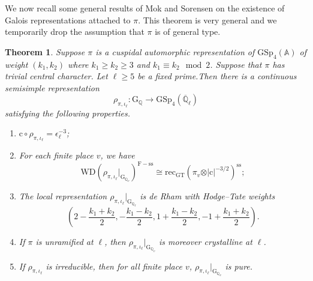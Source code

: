 \documentclass[10pt]{amsart}
\numberwithin{equation}{section}
\newtheorem{theorem}[equation]{Theorem}
\theoremstyle{definition}
\def\GSp{\mathrm{GSp}}
\def\QQ{\mathbb{Q}}
\def\rmc{\mathrm{c}}
\def\rmF{\mathrm{F}}
\def\rmG{\mathrm{G}}
\begin{document}
We now recall some general results of Mok and Sorensen on the existence of Galois representations attached to $\pi$. This theorem is very general and we temporarily drop the assumption that $\pi$ is of general type.

\begin{theorem}\label{Galois}
Suppose $\pi$ is a cuspidal automorphic representation of $\GSp_{4}(\mathbb{A})$ of weight $(k_{1}, k_{2})$ where $k_{1}\geq k_{2}\geq 3$ and $k_{1} \equiv k_{2}\mod 2$. Suppose that $\pi$ has trivial central character. Let $\ell\geq 5$ be a fixed prime.Then there is a continuous semisimple representation 
\begin{equation*}
\rho_{\pi, \iota_{\ell}}: \rmG_{\QQ}\rightarrow \GSp_{4}(\overline{\QQ}_{\ell})
\end{equation*}
satisfying the following properties.
\begin{enumerate}
\item $\rmc\circ\rho_{\pi, \iota_{\ell}}=\epsilon^{-3}_{\ell}$;
\item For each finite place $v$, we have
\begin{equation*}
\mathrm{WD}(\rho_{\pi,\iota_{\ell}}\vert_{\rmG_{\QQ_{v}}})^{\rmF-\mathrm{ss}}\cong \mathrm{rec}_{\mathrm{GT}}(\pi_{v}\otimes\vert\rmc\vert^{-3/2})^{\mathrm{ss}};
\end{equation*}
\item The local representation $\rho_{\pi,\iota_{\ell}}\vert_{\rmG_{\QQ_{\ell}}}$ is de Rham with Hodge--Tate weights 
\begin{equation*}
(2-\frac{k_{1}+k_{2}}{2}, -\frac{k_{1}-k_{2}}{2}, 1+\frac{k_{1}-k_{2}}{2}, -1+\frac{k_{1}+k_{2}}{2}).
\end{equation*}
\item If $\pi$ is unramified at $\ell$, then $\rho_{\pi,\iota_{\ell}}\vert_{\rmG_{\QQ_{v}}}$ is moreover crystalline at $\ell$.
\item If $\rho_{\pi, \iota_{\ell}}$ is irreducible, then for all finite place $v$, $\rho_{\pi, \iota_{\ell}}\vert_{\rmG_{\QQ_{v}}}$ is pure.  
\end{enumerate}
\end{theorem}
\end{document}
